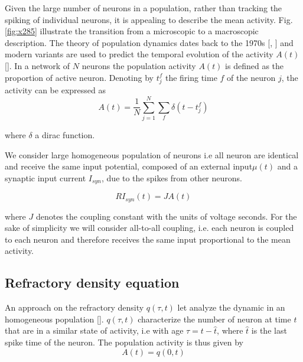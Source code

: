 \documentclass[12pt,twoside]{report}
\begin{document}
Given the large number of neurons in a population, rather than tracking the spiking of individual neurons,  it is appealing to describe the mean activity. Fig.\ref{fig:x285} illustrate the transition from a microscopic to a macroscopic description. The theory of population dynamics dates back to the 1970s [\cite{Kni72}, \cite{WilCow72}] and modern variants are used to predict the temporal evolution of the activity $A(t)$ [\cite{SchDeg17}]. In a network of $N$ neurons the population activity $A(t)$ is defined as the proportion of active neuron. Denoting by $t^f_j$ the firing time $f$ of the neuron $j$, the activity can be expressed as
\begin{equation}
A(t)=\frac{1}{N}\sum_{j=1}^N\sum_f\delta(t-t_j^f)
\end{equation}


where $\delta$ a dirac function.


We consider large homogeneous population of neurons i.e all neuron are identical and receive the same input potential, composed of an external input$\mu(t)$ and a synaptic input current $I_{syn}$, due to the spikes from other neurons.

\begin{equation}
\label{eq:input}
RI_{syn}(t)=JA(t)
\end{equation}

where $J$ denotes the coupling constant with the units of voltage seconds. For the sake of simplicity we will consider all-to-all coupling, i.e. each neuron is coupled to each neuron and therefore receives the same input proportional to the mean activity.

\subsection{Refractory density equation}
\label{secrefde}

An approach on the refractory density $q(\tau,t) $ let analyze the dynamic in an homogeneous population [\cite{GerKis02}]. $q(\tau,t)$ characterize the number of neuron at time $t$ that are in a similar state of activity, i.e with age $\tau=t-\hat{t}$, where $\hat{t}$ is the last spike time of the neuron. The population activity is thus given by
\begin{equation}
\label{eq:A}
A(t)=q(0,t)
\end{equation}
\end{document}
